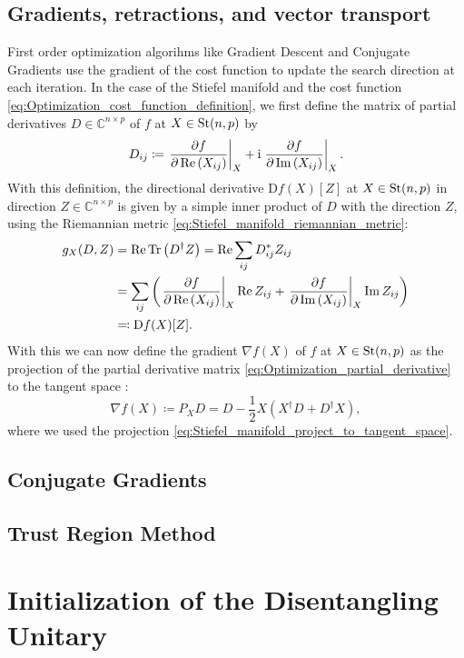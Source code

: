 \documentclass[encoding=utf8,british]{template/thesis}
\begin{document}
	\section{Gradients, retractions, and vector transport}
	
	First order optimization algorihms like Gradient Descent and Conjugate Gradients use the gradient of the cost function to update the search direction at each iteration. In the case of the Stiefel manifold and the cost function \eqref{eq:Optimization_cost_function_definition}, we first define the matrix of partial derivatives $D \in \mathbb{C}^{n\times p}$ of $f$ at $X\in\text{St}(n,p)$ by
	\begin{equation}
		\label{eq:Optimization_partial_derivative}
	 	D_{ij} \coloneqq \left.\frac{\partial f}{\partial \operatorname{Re}\left(X_{ij}\right)}\right|_{X} + \mathrm{i} \left.\frac{\partial f}{\partial \operatorname{Im}\left(X_{ij}\right)}\right|_{X}.
	\end{equation}
	With this definition, the directional derivative $\text{D}f(X)[Z]$ at $X\in\text{St}(n,p)$ in direction $Z\in\mathbb{C}^{n\times p}$ is given by a simple inner product of $D$ with the direction $Z$, using the Riemannian metric \eqref{eq:Stiefel_manifold_riemannian_metric}:
	\begin{equation}
		\label{eq:riemannian_optimization_directional_derivative_partial_derivatives}
		\begin{split}
			g_X(D, Z) &= \operatorname{Re}\operatorname{Tr}\left(D^\dagger Z\right) = \operatorname{Re}\sum_{ij} D_{ij}^*Z_{ij} \\
			&= \sum_{ij} \left(\left.\frac{\partial f}{\partial \operatorname{Re}\left(X_{ij}\right)}\right|_{X}\operatorname{Re} Z_{ij} + \left.\frac{\partial f}{\partial \operatorname{Im}\left(X_{ij}\right)}\right|_{X} \operatorname{Im} Z_{ij}\right) \\
			&\eqqcolon \text{D}f(X)[Z].
		\end{split}
	\end{equation}
	With this we can now define the gradient $\nabla f(X)$ of $f$ at $X\in\text{St}(n,p)$ as the projection of the partial derivative matrix \eqref{eq:Optimization_partial_derivative} to the tangent space \cite{cite:optimization_on_matrix_manifolds, cite:riemannian_optimization_isometric_tensor_networks}:
	\begin{equation}
		\label{eq:riemannian_optimization_gradient_of_cost_function}
		\nabla f(X) \coloneqq P_X D = D - \frac{1}{2}X\left(X^\dagger D + D^\dagger X\right),
	\end{equation}
	where we used the projection \eqref{eq:Stiefel_manifold_project_to_tangent_space}.
	
	\section{Conjugate Gradients}
	
	\section{Trust Region Method}
	
	
	\chapter{Initialization of the Disentangling Unitary}
	
	\backmatter
	\printbibliography
	
\end{document}
